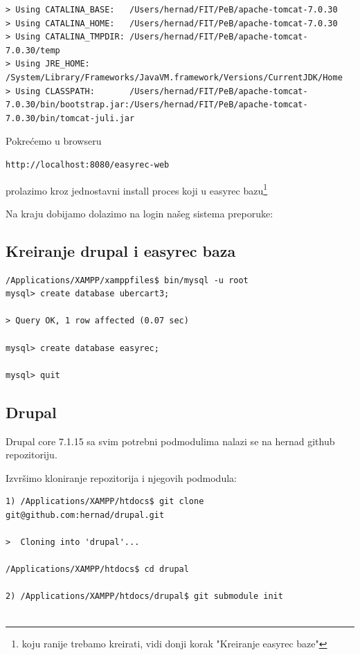 \documentclass[times, utf8, seminar]{fit}
\begin{document}
{{{\begin{lstlisting}
> Using CATALINA_BASE:   /Users/hernad/FIT/PeB/apache-tomcat-7.0.30
> Using CATALINA_HOME:   /Users/hernad/FIT/PeB/apache-tomcat-7.0.30
> Using CATALINA_TMPDIR: /Users/hernad/FIT/PeB/apache-tomcat-7.0.30/temp
> Using JRE_HOME:        /System/Library/Frameworks/JavaVM.framework/Versions/CurrentJDK/Home
> Using CLASSPATH:       /Users/hernad/FIT/PeB/apache-tomcat-7.0.30/bin/bootstrap.jar:/Users/hernad/FIT/PeB/apache-tomcat-7.0.30/bin/tomcat-juli.jar
\end{lstlisting}

Pokrećemo u browseru 

\begin{lstlisting}
http://localhost:8080/easyrec-web
\end{lstlisting}

prolazimo kroz jednostavni install proces koji u easyrec bazu\footnote{koju ranije trebamo kreirati, vidi donji korak "Kreiranje easyrec baze"} 

Na kraju dobijamo dolazimo na login našeg sistema preporuke:

\subsection{Kreiranje drupal i easyrec baza}

\begin{lstlisting}
/Applications/XAMPP/xamppfiles$ bin/mysql -u root
mysql> create database ubercart3;

> Query OK, 1 row affected (0.07 sec)

mysql> create database easyrec;

mysql> quit

\end{lstlisting}

\subsection{Drupal}

Drupal core 7.1.15 sa svim potrebni podmodulima nalazi se na hernad github repozitoriju. 

Izvršimo kloniranje repozitorija i njegovih podmodula:

\begin{lstlisting}
1) /Applications/XAMPP/htdocs$ git clone git@github.com:hernad/drupal.git

>  Cloning into 'drupal'...

/Applications/XAMPP/htdocs$ cd drupal

2) /Applications/XAMPP/htdocs/drupal$ git submodule init 


\end{lstlisting}}}}
\end{document}
